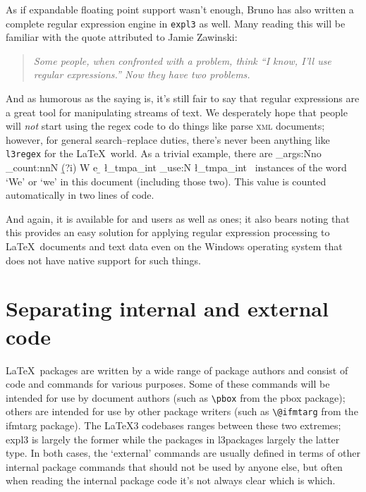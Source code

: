 \documentclass{ltnews}
\begin{document}
As if expandable floating point support wasn't enough, Bruno has also written a complete regular expression engine in \texttt{expl3} as well.
Many reading this will be familiar with the quote attributed to Jamie Zawinski:
\begin{quote}\itshape
Some people, when confronted with a problem, think
``I know, I'll use regular expressions.''
Now they have two problems.
\end{quote}
And as humorous as the saying is, it's still fair to say that regular expressions are a great tool for manipulating streams of text.
We desperately hope that people will \emph{not} start using the regex code to do things like parse \textsc{xml} documents; however, for general search--replace duties, there's never been anything like \texttt{l3regex} for the \LaTeX\ world.
As a trivial example, there are
\CatchFileDef{}%
\ExplSyntaxOn
\exp_args:Nno \regex_count:nnN { \b (?i) W e \b  } {\thisfile} \l_tmpa_int
\int_use:N \l_tmpa_int
\ExplSyntaxOff
~instances of the word `We' or `we' in this document (including those two).
This value is counted automatically in two lines of code.

And again, it is available for  and  users as well as  ones; it also bears noting that this provides an easy solution for applying regular expression processing to \LaTeX\ documents and text data even on the Windows operating system that does not have native support for such things.


\section{Separating internal and external code}

\LaTeX\ packages are written by a wide range of package authors and consist of code and commands for various purposes.
Some of these commands will be intended for use by document authors (such as \verb|\pbox| from the \textsf{pbox} package); others are intended for use by other package writers (such as \verb|\@ifmtarg| from the \textsf{ifmtarg} package).
The \LaTeX3 codebases ranges between these two extremes; \textsf{expl3} is largely the former while the packages in \textsf{l3packages} largely the latter type.
In both cases, the `external' commands are usually defined in terms of other internal package commands that should not be used by anyone else, but often when reading the internal package code it's not always clear which is which.
\end{document}
